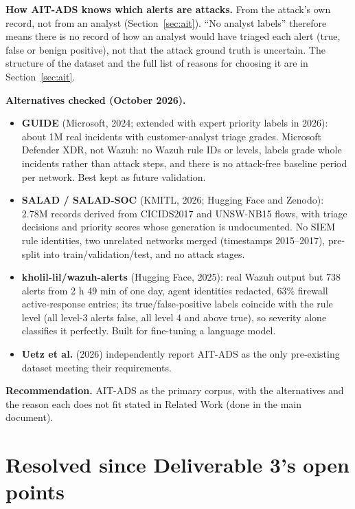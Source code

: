 \documentclass[10.5pt,a4paper]{article}
\newcommand{\rec}[1]{\par\smallskip\noindent\colorbox{gray!12}{\parbox{\dimexpr\linewidth-2\fboxsep}{\textbf{Recommendation.} #1}}\par\smallskip}
\newcommand{\sub}[1]{\par\smallskip\noindent\textbf{#1}\quad}
\begin{document}
\sub{How AIT-ADS knows which alerts are attacks.} From the attack's own record, not from an analyst (Section~\ref{sec:ait}). ``No analyst labels'' therefore means there is no record of how an analyst would have triaged each alert (true, false or benign positive), not that the attack ground truth is uncertain. The structure of the dataset and the full list of reasons for choosing it are in Section~\ref{sec:ait}.

\sub{Alternatives checked (October 2026).}
\begin{itemize}
\item \textbf{GUIDE} (Microsoft, 2024; extended with expert priority labels in 2026): about 1M real incidents with customer-analyst triage grades. Microsoft Defender XDR, not Wazuh: no Wazuh rule IDs or levels, labels grade whole incidents rather than attack steps, and there is no attack-free baseline period per network. Best kept as future validation.
\item \textbf{SALAD / SALAD-SOC} (KMITL, 2026; Hugging Face and Zenodo): 2.78M records derived from CICIDS2017 and UNSW-NB15 flows, with triage decisions and priority scores whose generation is undocumented. No SIEM rule identities, two unrelated networks merged (timestamps 2015--2017), pre-split into train/validation/test, and no attack stages.
\item \textbf{kholil-lil/wazuh-alerts} (Hugging Face, 2025): real Wazuh output but 738 alerts from 2 h 49 min of one day, agent identities redacted, 63\% firewall active-response entries; its true/false-positive labels coincide with the rule level (all level-3 alerts false, all level 4 and above true), so severity alone classifies it perfectly. Built for fine-tuning a language model.
\item \textbf{Uetz et al.} (2026) independently report AIT-ADS as the only pre-existing dataset meeting their requirements.
\end{itemize}

\rec{AIT-ADS as the primary corpus, with the alternatives and the reason each does not fit stated in Related Work (done in the main document).}

\section{Resolved since Deliverable 3's open points}
\label{sec:resolved}
\end{document}
